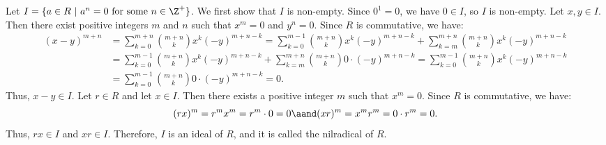 \begin{solution}
  Let $I = \{a \in R~|~a^n = 0~\text{for some}~n \in \Z^+\}$. We first show that $I$ is non-empty. Since $0^1 = 0$, we have $0 \in I$, so $I$ is non-empty. Let $x, y \in I$. Then there exist positive integers $m$ and $n$ such that $x^m = 0$ and $y^n = 0$. Since $R$ is commutative, we have:
  \begin{align*}
    (x - y)^{m+n} &= \sum_{k=0}^{m+n} \binom{m+n}{k} x^k (-y)^{m+n-k} = \sum_{k=0}^{m-1} \binom{m+n}{k} x^k (-y)^{m+n-k} + \sum_{k=m}^{m+n} \binom{m+n}{k} x^k (-y)^{m+n-k} \\
                  &= \sum_{k=0}^{m-1} \binom{m+n}{k} x^k (-y)^{m+n-k} + \sum_{k=m}^{m+n} \binom{m+n}{k} 0 \cdot (-y)^{m+n-k} = \sum_{k=0}^{m-1} \binom{m+n}{k} x^k (-y)^{m+n-k} \\
                  &= \sum_{k=0}^{m-1} \binom{m+n}{k} 0 \cdot (-y)^{m+n-k} = 0
  .\end{align*}
  Thus, $x - y \in I$. Let $r \in R$ and let $x \in I$. Then there exists a positive integer $m$ such that $x^m = 0$. Since $R$ is commutative, we have:
  \[%
    (rx)^m = r^m x^m = r^m \cdot 0 = 0 \aand (xr)^m = x^m r^m = 0 \cdot r^m = 0
  .\]%
  Thus, $rx \in I$ and $xr \in I$. Therefore, $I$ is an ideal of $R$, and it is called the nilradical of $R$.
\end{solution}
